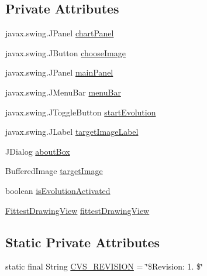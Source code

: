 \subsection*{Private Attributes}
\begin{DoxyCompactItemize}
\item 
javax.\-swing.\-J\-Panel \hyperlink{classexamples_1_1monalisa_1_1gui_1_1_genetic_drawing_view_ab5b7170c87617ee05a1f3d2d9dc3b7e1}{chart\-Panel}
\item 
javax.\-swing.\-J\-Button \hyperlink{classexamples_1_1monalisa_1_1gui_1_1_genetic_drawing_view_af2fed74398219a22484041ae8cead137}{choose\-Image}
\item 
javax.\-swing.\-J\-Panel \hyperlink{classexamples_1_1monalisa_1_1gui_1_1_genetic_drawing_view_a6815608f2495773c4020cf9037dc66c4}{main\-Panel}
\item 
javax.\-swing.\-J\-Menu\-Bar \hyperlink{classexamples_1_1monalisa_1_1gui_1_1_genetic_drawing_view_a8e859903eaad4bff7e0828d1059668a4}{menu\-Bar}
\item 
javax.\-swing.\-J\-Toggle\-Button \hyperlink{classexamples_1_1monalisa_1_1gui_1_1_genetic_drawing_view_a9ff624a5edfba908832ebc62da74177d}{start\-Evolution}
\item 
javax.\-swing.\-J\-Label \hyperlink{classexamples_1_1monalisa_1_1gui_1_1_genetic_drawing_view_a38fa970d741f300058eac2035a05f6e0}{target\-Image\-Label}
\item 
J\-Dialog \hyperlink{classexamples_1_1monalisa_1_1gui_1_1_genetic_drawing_view_a44e08f004a5cde193b3acf3400a79725}{about\-Box}
\item 
Buffered\-Image \hyperlink{classexamples_1_1monalisa_1_1gui_1_1_genetic_drawing_view_a57e882dc484b79602829ccf81c8c88dc}{target\-Image}
\item 
boolean \hyperlink{classexamples_1_1monalisa_1_1gui_1_1_genetic_drawing_view_a0fcd46bd3a086d71217753e1f6881796}{is\-Evolution\-Activated}
\item 
\hyperlink{classexamples_1_1monalisa_1_1gui_1_1_fittest_drawing_view}{Fittest\-Drawing\-View} \hyperlink{classexamples_1_1monalisa_1_1gui_1_1_genetic_drawing_view_a1e46cb2a37922bd7bc43dd7ca877d7a2}{fittest\-Drawing\-View}
\end{DoxyCompactItemize}
\subsection*{Static Private Attributes}
\begin{DoxyCompactItemize}
\item 
static final String \hyperlink{classexamples_1_1monalisa_1_1gui_1_1_genetic_drawing_view_ab369434ac61a0e46b59a87532f71e46a}{C\-V\-S\-\_\-\-R\-E\-V\-I\-S\-I\-O\-N} = \char`\"{}\$Revision\-: 1. \$\char`\"{}
\end{DoxyCompactItemize}


